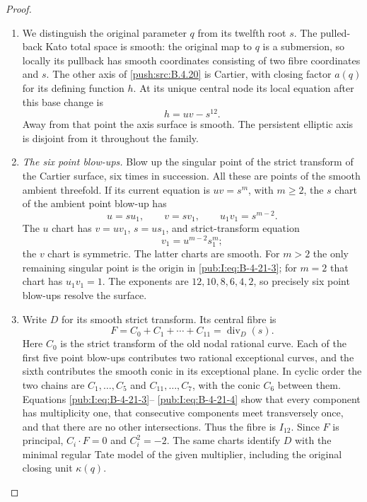 \begin{proof}
\begin{enumerate}[label=\arabic*.,leftmargin=*]
\item We distinguish the original parameter $q$ from its twelfth root
$s$.  The pulled-back Kato total space is smooth: the original
map to $q$ is a submersion, so locally its pullback has smooth
coordinates consisting of two fibre coordinates and $s$.
The other axis of \ref{push:src:B.4.20} is Cartier, with closing factor $a(q)$
for its defining function $h$.  At its unique central node its
local equation after this base change is
\begin{equation}
 h=uv-s^{12}.
\label{pub:I:eq:B-4-21-2}
\end{equation}
Away from that point the axis surface is smooth.  The persistent
elliptic axis is disjoint from it throughout the family.

\item \emph{The six point blow-ups.}
Blow up the singular point of the strict transform of the
Cartier surface, six times in succession.  All these are points
of the smooth ambient threefold.  If its current equation is
$uv=s^m$, with $m\ge2$, the $s$ chart of the ambient point
blow-up has
\begin{equation}
 u=su_1,\qquad v=sv_1,
 \qquad u_1v_1=s^{m-2}.
\label{pub:I:eq:B-4-21-3}
\end{equation}
The $u$ chart has $v=uv_1$, $s=us_1$, and strict-transform
equation
\begin{equation}
 v_1=u^{m-2}s_1^m;
\label{pub:I:eq:B-4-21-4}
\end{equation}
the $v$ chart is symmetric.  The latter charts are smooth.
For $m>2$ the only remaining singular point is the origin in
\eqref{pub:I:eq:B-4-21-3}; for $m=2$ that chart has $u_1v_1=1$.
The exponents are $12,10,8,6,4,2$, so precisely six point
blow-ups resolve the surface.

\item Write $D$ for its smooth strict transform.  Its central fibre is
\begin{equation}
 F=C_0+C_1+\cdots+C_{11}=\operatorname{div}_D(s).
\label{pub:I:eq:B-4-21-5}
\end{equation}
Here $C_0$ is the strict transform of the old nodal rational
curve.  Each of the first five point blow-ups contributes two
rational exceptional curves, and the sixth contributes the
smooth conic in its exceptional plane.  In cyclic order the
two chains are $C_1,\ldots,C_5$ and $C_{11},\ldots,C_7$, with
the conic $C_6$ between them.  Equations \eqref{pub:I:eq:B-4-21-3}--
\eqref{pub:I:eq:B-4-21-4} show that every component has multiplicity one,
that consecutive components meet transversely once, and that
there are no other intersections.  Thus the fibre is $I_{12}$.
Since $F$ is principal, $C_i\cdot F=0$ and $C_i^2=-2$.
The same charts identify $D$ with the minimal regular Tate
model of the given multiplier, including the original closing
unit $\kappa(q)$.


\end{enumerate}
\end{proof}
